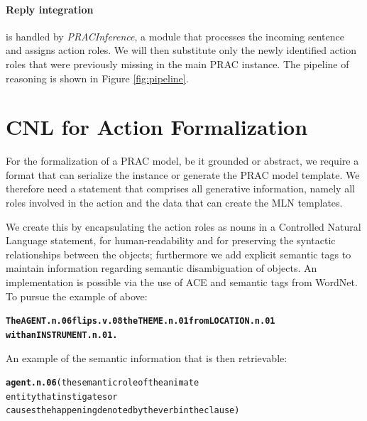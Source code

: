 \documentclass[oribibl]{llncs}
\begin{document}



\paragraph{Reply integration} is handled by \textit{PRACInference}, 
a module that processes the incoming sentence and assigns action 
roles. We will then substitute only the newly identified action 
roles that were previously missing in the main PRAC instance. The pipeline
of reasoning is shown in Figure \ref{fig:pipeline}.

\section{CNL for Action Formalization}
For the formalization of a PRAC model, be it grounded or abstract, we 
require a format that can serialize the instance or generate the PRAC 
model template.
We therefore need a statement that comprises all generative information,
 namely all roles involved in the action and the data that can create 
 the MLN templates.  

We create this by encapsulating the action roles as nouns in a Controlled 
Natural Language statement, for human-readability and for preserving the 
syntactic relationships between the objects; furthermore we add explicit 
semantic tags to maintain information regarding semantic disambiguation
 of objects.
An implementation is possible via the use of ACE and semantic tags from 
WordNet\cite{Miller95wordnet:a}. To pursue the example of above:
\begin{alltt}
\textbf{The AGENT.n.06 flips.v.08 the THEME.n.01 from LOCATION.n.01 \\
with an INSTRUMENT.n.01.}
\end{alltt}
An example of the semantic information that is then retrievable:
{\small
\begin{alltt}
\textbf{agent.n.06} {\color{red}(the semantic role of the animate 
entity that instigates or 
causes the happening denoted by the verb in the clause)}
\end{alltt}}
\end{document}
